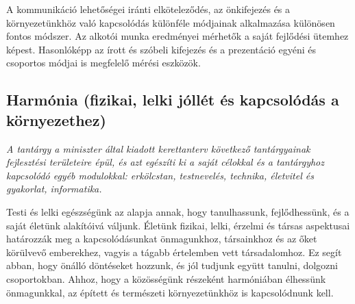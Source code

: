 A kommunikáció lehetőségei iránti elköteleződés, az önkifejezés és a környezetünkhöz való kapcsolódás különféle módjainak alkalmazása különösen fontos módszer. Az alkotói munka eredményei mérhetők a saját fejlődési ütemhez képest. Hasonlóképp az írott és szóbeli kifejezés és a prezentáció egyéni és csoportos módjai is megfelelő mérési eszközök.

\subsection[Harmónia]{Harmónia (fizikai, lelki jóllét és kapcsolódás a környezethez)}
\emph{A tantárgy a miniszter által kiadott kerettanterv következő tantárgyainak fejlesztési területeire épül, és azt egészíti ki a saját célokkal és a tantárgyhoz kapcsolódó egyéb modulokkal: erkölcstan, testnevelés, technika, életvitel és gyakorlat, informatika.}

Testi és lelki egészségünk az alapja annak, hogy tanulhassunk, fejlődhessünk, és a saját életünk alakítóivá váljunk. Életünk fizikai, lelki, érzelmi és társas aspektusai határozzák meg a kapcsolódásunkat önmagunkhoz, társainkhoz és az őket körülvevő emberekhez, vagyis a tágabb értelemben vett társadalomhoz. Ez segít abban, hogy önálló döntéseket hozzunk, és jól tudjunk együtt tanulni, dolgozni csoportokban. Ahhoz, hogy a közösségünk részeként harmóniában élhessünk önmagunkkal, az épített és természeti környezetünkhöz is kapcsolódnunk kell.


